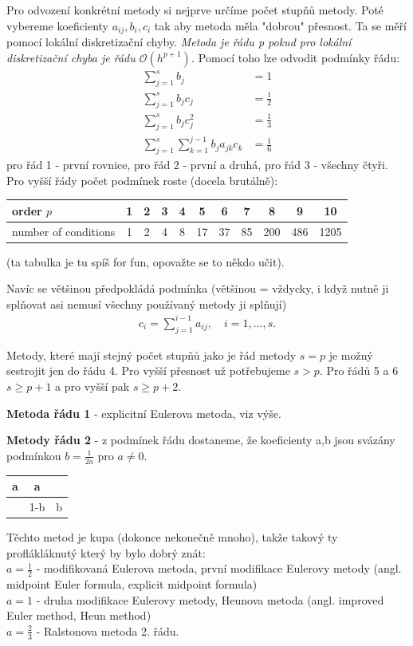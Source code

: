 \documentclass[a4]{report}
\theoremstyle{definition}
\begin{document}
{Pro odvození konkrétní metody si nejprve určíme počet stupňů metody. Poté vybereme koeficienty $a_{ij}, b_{i}, c_{i}$ tak aby metoda měla "dobrou" přesnost. Ta se měří pomocí lokální diskretizační chyby.\textit{ Metoda je řádu \textit{p} pokud pro lokální diskretizační chyba je řádu $\mathcal{O}(h^{p+1})$.} Pomocí toho lze odvodit podmínky řádu:
 \begin{align*}
 \sum _{j=1} ^{s}  b_{j} &= 1 \nonumber \\
 \sum _{j=1} ^{s}  b_{j}c_{j} &= \frac{1}{2}  \nonumber \\
 \sum _{j=1} ^{s} b_{j}c_{j}^{2}  &= \frac{1}{3} \nonumber \\
 \sum_{j=1} ^{s}  \sum _{k=1} ^{j-1} b_{j}a_{jk}c_{k}  &= \frac{1}{6} \nonumber
 \end{align*}
pro řád 1 - první rovnice, pro řád 2 - první a druhá, pro řád 3 - všechny čtyři. Pro vyšší řády počet podmínek roste (docela brutálně):
\begin{center}
\begin{tabular}{l|cccccccccc}
order $p$ & 1 & 2& 3& 4& 5&6&7&8&9&10 \\ \hline
number of conditions & 1 & 2& 4& 8& 17& 37& 85& 200& 486& 1205
\end{tabular}
\end{center}
(ta tabulka je tu spíš for fun, opovažte se to někdo učit).


Navíc se většinou předpokládá podmínka (většinou = vždycky, i když nutně ji splňovat asi nemusí všechny používaný metody ji splňují)
\begin{align}
c_{i}=\sum _{j=1} ^{i-1} a_{ij},\quad i=1,...,s.
\end{align}

Metody, které mají stejný počet stupňů jako je řád metody $s=p$ je možný sestrojit jen do řádu 4. Pro vyšší přesnost už potřebujeme $s > p$. Pro řádů 5 a 6 $s \geq p+1$ a pro vyšší pak $s \geq p+2$. 

\textbf{Metoda řádu 1} - explicitní Eulerova metoda, viz výše. 

\textbf{Metody řádu 2} - z podmínek řádu dostaneme, že koeficienty a,b jsou svázány podmínkou $b= \frac{1}{2a}$ pro $a\neq 0$. 
\begin{center}
\begin{tabular}{c|cc}
a & a \\ \hline
& 1-b & b
\end{tabular}
\end{center}
Těchto metod je kupa (dokonce nekonečně mnoho), takže takový ty proflákláknutý  který by bylo dobrý znát: \\
$a=\frac{1}{2}$ - modifikovaná Eulerova metoda, první modifikace Eulerovy metody (angl. midpoint Euler formula, explicit midpoint formula) \\
$a= 1$ - druha modifikace Eulerovy metody, Heunova metoda (angl. improved Euler method, Heun method) \\
$a=\frac{2}{3}$ - Ralstonova metoda 2. řádu. 

}
\end{document}
